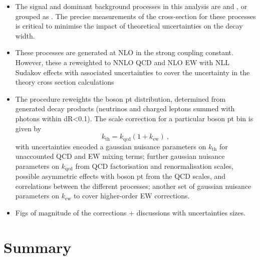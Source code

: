 \begin{itemize}
    \item The signal and dominant background processes in this analysis are \IZj and \IWj, or grouped as \IVj. The precise measurements of the cross-section for these processes is critical to minimise the impact of theoretical uncertainties on the \IZinv decay width.
    \item These \IVj processes are generated at NLO in the strong coupling constant. However, these a reweighted to NNLO QCD and NLO EW with NLL Sudakov effects with associated uncertainties to cover the uncertainty in the theory cross section calculations \cite{Lindert:2017olm}
    \item The procedure reweights the boson pt distribution, determined from generated decay products (neutrinos and charged leptons summed with photons within dR<0.1). The scale correction for a particular boson pt bin is given by
    \begin{equation}
        k_{\mathrm{th}} = k_{\mathrm{qcd}} \left( 1 + k_{\mathrm{ew}} \right)\ ,
    \end{equation}
    with uncertainties encoded a gaussian nuisance parameters on $k_{\mathrm{th}}$ for unaccounted QCD and EW mixing terms; further gaussian nuisance parameters on $k_{\mathrm{qcd}}$ from QCD factorisation and renormalisation scales, possible asymmetric effects with boson pt from the QCD scales, and correlations between the different \IVj processes; another set of gaussian nuisance parameters on $k_{\mathrm{ew}}$ to cover higher-order EW corrections.
    \item Figs of magnitude of the corrections + discussions with uncertainties sizes.
\end{itemize}

\section{Summary}